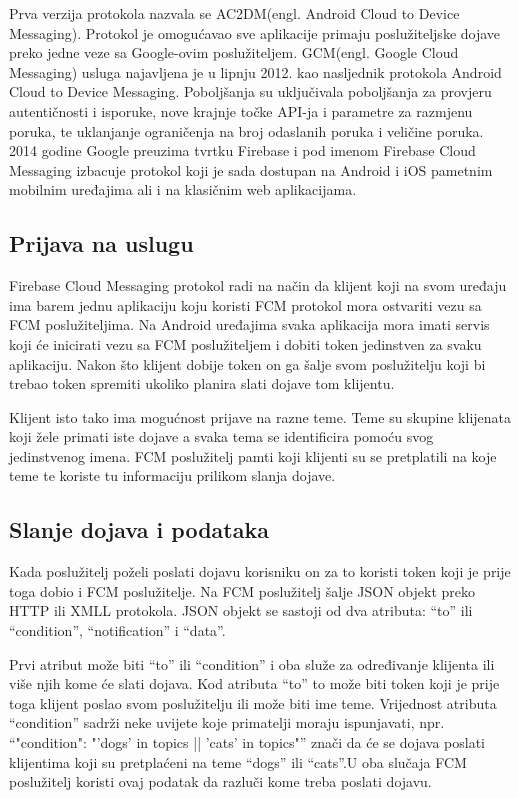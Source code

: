 \documentclass[times, utf8, zavrsni]{fer}
\begin{document}
Prva verzija protokola nazvala se AC2DM(engl. Android Cloud to Device Messaging). Protokol je omogućavao sve aplikacije primaju poslužiteljske dojave preko jedne veze sa Google-ovim poslužiteljem. GCM(engl. Google Cloud Messaging) usluga najavljena je u lipnju 2012. kao nasljednik protokola Android Cloud to Device Messaging. Poboljšanja su uključivala poboljšanja za provjeru autentičnosti i isporuke, nove krajnje točke API-ja i parametre za razmjenu poruka, te uklanjanje ograničenja na broj odaslanih poruka i veličine poruka. 2014 godine Google preuzima tvrtku Firebase i pod imenom Firebase Cloud Messaging izbacuje protokol koji je sada dostupan na Android i iOS pametnim mobilnim uređajima ali i na klasičnim web aplikacijama.

\subsection{Prijava na uslugu}
Firebase Cloud Messaging protokol radi na način da klijent koji na svom uređaju ima barem jednu aplikaciju koju koristi FCM protokol mora ostvariti vezu sa FCM poslužiteljima. Na Android uređajima svaka aplikacija mora imati servis koji će inicirati vezu sa FCM poslužiteljem i dobiti token jedinstven za svaku aplikaciju. Nakon što klijent dobije token on ga šalje svom poslužitelju koji bi trebao token spremiti ukoliko planira slati dojave tom klijentu. 

Klijent isto tako ima mogućnost prijave na razne teme. Teme su skupine klijenata koji žele primati iste dojave a svaka tema se identificira pomoću svog jedinstvenog imena. FCM poslužitelj pamti koji klijenti su se pretplatili na koje teme te koriste tu informaciju prilikom slanja dojave. 

\subsection{Slanje dojava i podataka}
Kada poslužitelj poželi poslati dojavu korisniku on za to koristi token koji je prije toga dobio i FCM poslužitelje. Na FCM poslužitelj šalje JSON objekt preko HTTP ili XMLL protokola. JSON objekt se sastoji od dva atributa: ``to'' ili ``condition'', ``notification'' i ``data''.

Prvi atribut može biti ``to'' ili ``condition'' i oba služe za određivanje klijenta ili više njih kome će slati dojava. Kod atributa ``to'' to može biti token koji je prije toga klijent poslao svom poslužitelju ili može biti ime teme. Vrijednost atributa ``condition'' sadrži neke uvijete koje primatelji moraju ispunjavati, npr. ``"condition": "'dogs' in topics || 'cats' in topics"'' znači da će se dojava poslati klijentima koji su pretplaćeni na teme ``dogs'' ili ``cats''.U oba slučaja FCM poslužitelj koristi ovaj podatak da razluči kome treba poslati dojavu.
\end{document}
